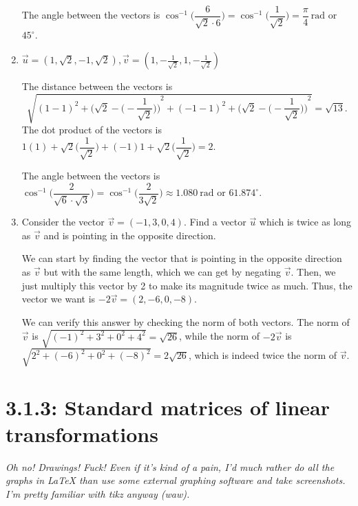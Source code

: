 \documentclass{article}
\begin{document}
\begin{enumerate}
\begin{solution}
        The angle between the vectors is \(\cos^{-1} \biggl(\dfrac{6}{\sqrt{2}\cdot6}\biggr) = \cos^{-1} \biggl(\dfrac{1}{\sqrt{2}}\biggr) = \dfrac{\pi}{4}~\text{rad}\) or \(45^{\circ}\).
    \end{solution}
    \item \(\overrightarrow{u} = (1,\sqrt{2},-1,\sqrt{2}), \overrightarrow{v} = (1,-\frac{1}{\sqrt{2}},1,-\frac{1}{\sqrt{2}})\)\begin{solution}
        The distance between the vectors is\[
            \sqrt{{(1-1)}^2 + {\Biggl(\sqrt{2} - \biggl(-\frac{1}{\sqrt{2}}\biggr)\Biggr)}^2 + {(-1-1)}^2 + {\Biggl(\sqrt{2} - \biggl(-\frac{1}{\sqrt{2}}\biggr)\Biggr)}^2} =  \sqrt{13}.
        \]
        The dot product of the vectors is \(1(1) + \sqrt{2}\biggl(\dfrac{1}{\sqrt{2}}\biggr) + (-1)1 + \sqrt{2}\biggl(\dfrac{1}{\sqrt{2}}\biggr) = 2\).\par 
        The angle between the vectors is \(\cos^{-1} \biggl(\dfrac{2}{\sqrt{6}\cdot\sqrt{3}}\biggr) = \cos^{-1} \biggl(\dfrac{2}{3\sqrt{2}}\biggr) \approx 1.080~\text{rad} \) or \(61.874^{\circ}\). 
    \end{solution}
    \item Consider the vector \(\overrightarrow{v} = (-1,3,0,4)\). Find a vector \(\overrightarrow{u}\) which is twice as long as \(\overrightarrow{v}\) and is pointing in the opposite direction.\begin{solution}
        We can start by finding the vector that is pointing in the opposite direction as \(\overrightarrow{v}\) but with the same length, which we can get by negating \(\overrightarrow{v}\). Then, we just multiply this vector by 2 
        to make its magnitude twice as much. Thus, the vector we want is \(-2\overrightarrow{v} = (2,-6,0,-8)\).\par 
        We can verify this answer by checking the norm of both vectors. The norm of \(\overrightarrow{v}\) is \(\sqrt{{(-1)}^2 + 3^2 + 0^2 + 4^2} = \sqrt{26}\), while the norm of \(-2\overrightarrow{v}\) is \(\sqrt{2^2 + {(-6)}^2 + 0^2 + {(-8)}^2} = 2\sqrt{26}\), 
        which is indeed twice the norm of \(\overrightarrow{v}\).
    \end{solution}
\end{enumerate}
\pagebreak

\section*{3.1.3: Standard matrices of linear transformations}
\textit{Oh no! Drawings! Fuck! Even if it's kind of a pain, I'd much rather do all the graphs in \LaTeX{} than use some external graphing software and take screenshots. I'm pretty familiar with tikz anyway (waw). }
\pagebreak 
\end{document}
